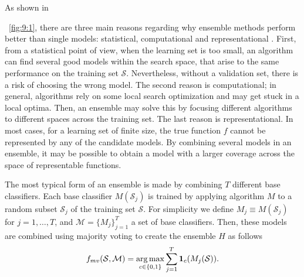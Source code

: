As shown in \figurename{~\ref{fig:9:1}, there are three main reasons regarding why ensemble 
methods perform better than single models: statistical, computational and representational 
\citep{Dietterich2000a}. First, from a statistical point of view, when the learning set is too 
small, an algorithm can find several good models within the search space, that arise to the same 
performance on the training set $\mathcal{S}$. Nevertheless, without a validation set, there is 
a risk of choosing the wrong model. The second reason is computational; in general, algorithms 
rely on some local search optimization and may get stuck in a local optima. Then, an ensemble may 
solve this by focusing different algorithms to different spaces across the training set. The last 
reason is representational. In most cases, for a learning set of finite size, the  true function 
$f$ cannot be represented by any of the candidate models. By combining several  models in an 
ensemble, it may be possible to obtain a model with a larger coverage across the  space of 
representable functions.
  

  
  The most typical form of an ensemble is made by combining $T$ different base classifiers.
  Each  base classifier $M(\mathcal{S}_j)$ is trained by applying algorithm $M$ to a random subset 
  $\mathcal{S}_j$ of the training set $\mathcal{S}$.  %
  For simplicity we define $M_j \equiv  M(\mathcal{S}_j)$ for $j=1,\dots,T$, and 
  $\mathcal{M}=\{M_j\}_{j=1}^{T}$ a set of base classifiers.
  Then, these models are combined using majority voting to create the ensemble $H$ as follows
  \begin{align}\label{eq:9:majority-vote}
    f_{mv}(\mathcal{S},\mathcal{M}) = \operatorname*{arg\,max}_{c \in \{0,1\}} \sum_{j=1}^T 
    \mathbf{1}_c(M_j(\mathcal{S})).
  \end{align}


}
